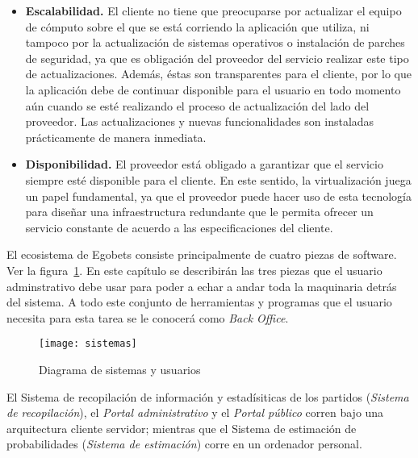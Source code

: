\begin{itemize}
	\item \textbf{Escalabilidad.} El cliente no tiene que preocuparse por actualizar el equipo de cómputo sobre el que se está corriendo la aplicación que utiliza, ni tampoco por la actualización de sistemas operativos o instalación de parches de seguridad, ya que es obligación del proveedor del servicio realizar este tipo de actualizaciones. Además, éstas son transparentes para el cliente, por lo que la aplicación debe de continuar disponible para el usuario en todo momento aún cuando se esté realizando el proceso de actualización del lado del proveedor. Las actualizaciones y nuevas funcionalidades son instaladas prácticamente de manera inmediata.

	\item \textbf{Disponibilidad.} El proveedor está obligado a garantizar que el servicio siempre esté disponible para el cliente. En este sentido, la virtualización juega un papel fundamental, ya que el proveedor puede hacer uso de esta tecnología para diseñar una infraestructura redundante que le permita ofrecer un servicio constante de acuerdo a las especificaciones del cliente.

\end{itemize}

\graphicspath{{/Users/brunomedina/Dropbox/Tesis-Egobets/egobets-notas/resources/diagramas/}}
El ecosistema de Egobets consiste principalmente de cuatro piezas de software. Ver la figura~\ref{Fig:Sistemas}. En este capítulo se describirán las tres piezas que el usuario adminstrativo debe usar para poder a echar a andar toda la maquinaria detrás del sistema. A todo este conjunto de herramientas y programas que el usuario necesita para esta tarea se le conocerá como \emph{Back Office}.


\begin{figure}[!htb]\centering
   \begin {minipage}{1\textwidth}
     \texttt{[image: sistemas]}
     \caption{Diagrama de sistemas y usuarios}\label{Fig:Sistemas}
   \end{minipage}
\end{figure}

El Sistema de recopilación de información y estadísiticas de los partidos (\emph{Sistema de recopilación}), el \emph{Portal administrativo} y el \emph{Portal público} corren bajo una arquitectura cliente servidor; mientras que el Sistema de estimación de probabilidades (\emph{Sistema de estimación}) corre en un ordenador personal.

